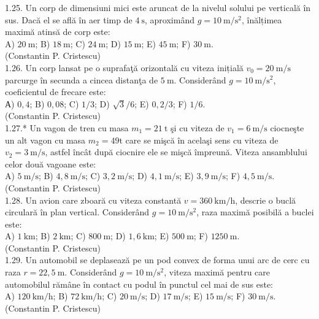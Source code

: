 \documentclass[10pt]{article}
\begin{document}
1.25. Un corp de dimensiuni mici este aruncat de la nivelul solului pe verticală în sus. Dacă el se află în aer timp de $4 \mathrm{~s}$, aproximând $g=10 \mathrm{~m} / \mathrm{s}^{2}$, înălțimea maximă atinsă de corp este:\\ A) $20 \mathrm{~m}$; B) $18 \mathrm{~m}$; C) $24 \mathrm{~m}$; D) $15 \mathrm{~m}$; E) $45 \mathrm{~m}$; F) $30 \mathrm{~m}$.\\ (Constantin P. Cristescu)\\

1.26. Un corp lansat pe o suprafaţă orizontală cu viteza inițială $v_{0}=20 \mathrm{~m} / \mathrm{s}$ parcurge în secunda a cincea distanţa de $5 \mathrm{~m}$. Considerând $g=10 \mathrm{~m} / \mathrm{s}^{2}$, coeficientul de frecare este:\\ А) $0,4$; B) $0,08$; C) $1 / 3$; D) $\sqrt{3} / 6$; E) $0,2 / 3$; F) $1 / 6$.\\ (Constantin P. Cristescu)\\

1.27.* Un vagon de tren cu masa $m_{1}=21 \mathrm{~t}$ şi cu viteza de $v_{1}=6 \mathrm{~m} / \mathrm{s}$ ciocneşte un alt vagon cu masa $m_{2}=49 \mathrm{t}$ care se mişcă în acelaşi sens cu viteza de $v_{2}=3 \mathrm{~m} / \mathrm{s}$, astfel încât după ciocnire ele se mişcă împreună. Viteza ansamblului celor două vagoane este:\\ A) $5 \mathrm{~m} / \mathrm{s}$; B) $4,8 \mathrm{~m} / \mathrm{s}$; C) $3,2 \mathrm{~m} / \mathrm{s}$; D) $4,1 \mathrm{~m} / \mathrm{s}$; E) $3,9 \mathrm{~m} / \mathrm{s}$; F) $4,5 \mathrm{~m} / \mathrm{s}$.\\ (Constantin P. Cristescu)\\

1.28. Un avion care zboară cu viteza constantă $v=360 \mathrm{~km} / \mathrm{h}$, descrie o buclă circulară în plan vertical. Considerând $g=10 \mathrm{~m} / \mathrm{s}^{2}$, raza maximă posibilă a buclei este:\\ A) $1 \mathrm{~km}$; B) $2 \mathrm{~km}$; C) $800 \mathrm{~m}$; D) $1,6 \mathrm{~km}$; E) $500 \mathrm{~m}$; F) $1250 \mathrm{~m}$.\\ (Constantin P. Cristescu)\\

1.29. Un automobil se deplasează pe un pod convex de forma unui arc de cerc cu raza $r=22,5 \mathrm{~m}$. Considerând $g=10 \mathrm{~m} / \mathrm{s}^{2}$, viteza maximă pentru care automobilul rămâne în contact cu podul în punctul cel mai de sus este:\\ A) $120 \mathrm{~km} / \mathrm{h}$; B) $72 \mathrm{~km} / \mathrm{h}$; C) $20 \mathrm{~m} / \mathrm{s}$; D) $17 \mathrm{~m} / \mathrm{s}$; E) $15 \mathrm{~m} / \mathrm{s}$; F) $30 \mathrm{~m} / \mathrm{s}$.\\ (Constantin P. Cristescu)\\
\end{document}
